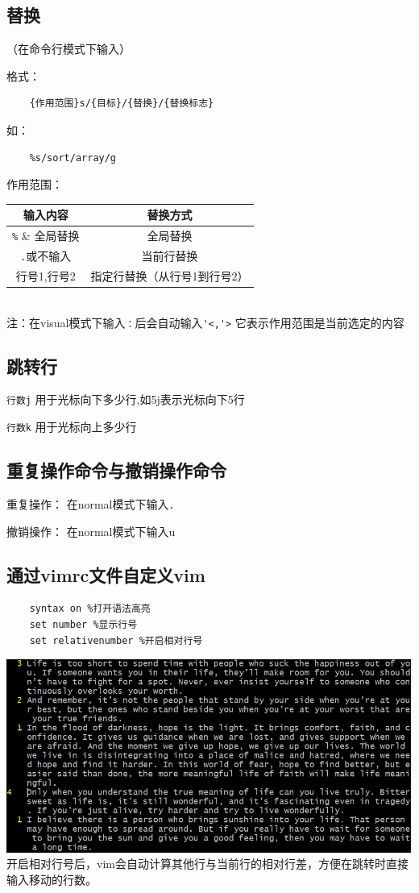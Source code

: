 \documentclass[UTF8,a4paper]{ctexart}
\begin{document}
\subsection{替换}
（在命令行模式下输入）\par
格式：
\begin{lstlisting}
    {作用范围}s/{目标}/{替换}/{替换标志}
\end{lstlisting}\par
如：
\begin{lstlisting}
    %s/sort/array/g
\end{lstlisting}\par
作用范围：
\begin{table}[H]
    \centering
    \begin{tabular}{|c|c|}
    \hline
    输入内容 & 替换方式\\
    \hline
    \verb|%| & 全局替换\\
    \hline
    \verb|.|或不输入 & 当前行替换\\
    \hline
    行号1,行号2 & 指定行替换（从行号1到行号2）\\
    \hline
\end{tabular}\\
注：在visual模式下输入\verb|：|后会自动输入\verb|'<,'>| 它表示作用范围是当前选定的内容
\end{table}

\subsection{跳转行}
\verb|行数j| 用于光标向下多少行,如5j表示光标向下5行\par
\verb|行数k| 用于光标向上多少行

\subsection{重复操作命令与撤销操作命令}
重复操作： 在normal模式下输入\verb|.|\par
撤销操作： 在normal模式下输入u

\subsection{通过vimrc文件自定义vim}
\begin{lstlisting}
    syntax on %打开语法高亮
    set number %显示行号
    set relativenumber %开启相对行号
\end{lstlisting}
\includegraphics[width=1\textwidth]{./pictures/passage.png}
开启相对行号后，vim会自动计算其他行与当前行的相对行差，方便在跳转时直接输入移动的行数。
\end{document}
